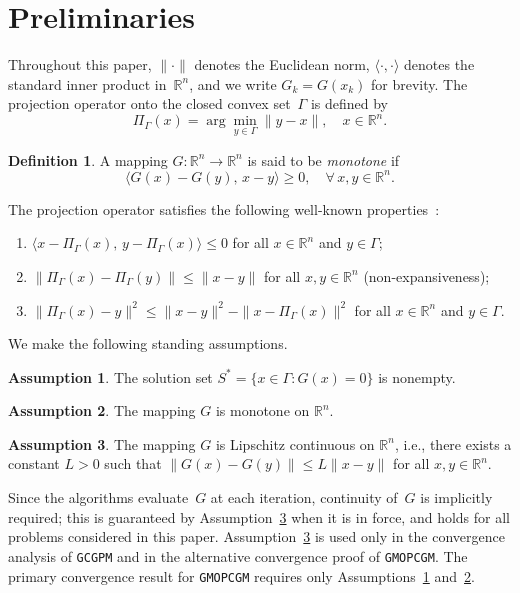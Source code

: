 \documentclass{article}
\theoremstyle{plain}
\theoremstyle{definition}
\newtheorem{definition}{Definition}
\newtheorem{assumption}{Assumption}
\theoremstyle{remark}
\newcommand{\R}{\mathbb{R}}
\newcommand{\norm}[1]{\|#1\|}
\newcommand{\PG}{\Pi_{\Gamma}}
\newcommand{\algoname}[1]{{\small\texttt{#1}}}
\newcommand{\GMOPCGM}{\algoname{GMOPCGM}}
\newcommand{\GCGPM}{\algoname{GCGPM}}
\begin{document}
\section{Preliminaries}\label{sec:prelim}

Throughout this paper, $\norm{\cdot}$ denotes the Euclidean norm, $\langle \cdot, \cdot \rangle$ denotes the standard inner product in~$\R^n$, and we write $G_k = G(x_k)$ for brevity. The projection operator onto the closed convex set~$\Gamma$ is defined by
\[
  \PG(x) = \arg\min_{y \in \Gamma} \norm{y - x}, \quad x \in \R^n.
\]

\begin{definition}\label{def:mono}
A mapping $G \colon \R^n \to \R^n$ is said to be \emph{monotone} if
\[
  \langle G(x) - G(y),\, x - y \rangle \geq 0, \quad \forall\, x, y \in \R^n.
\]
\end{definition}

The projection operator satisfies the following well-known properties~\cite{solodov1999globally}:
\begin{enumerate}[label=(\alph*), nosep]
  \item $\langle x - \PG(x),\, y - \PG(x) \rangle \leq 0$ for all $x \in \R^n$ and $y \in \Gamma$;
  \item $\norm{\PG(x) - \PG(y)} \leq \norm{x - y}$ for all $x, y \in \R^n$ (non-expansiveness);
  \item $\norm{\PG(x) - y}^2 \leq \norm{x - y}^2 - \norm{x - \PG(x)}^2$ for all $x \in \R^n$ and $y \in \Gamma$.
\end{enumerate}

We make the following standing assumptions.

\begin{assumption}\label{A1}
The solution set $S^* = \{x \in \Gamma : G(x) = 0\}$ is nonempty.
\end{assumption}

\begin{assumption}\label{A2}
The mapping $G$ is monotone on $\R^n$.
\end{assumption}

\begin{assumption}\label{A3}
The mapping $G$ is Lipschitz continuous on $\R^n$, i.e., there exists a constant $L > 0$ such that $\norm{G(x) - G(y)} \leq L\norm{x - y}$ for all $x, y \in \R^n$.
\end{assumption}

Since the algorithms evaluate~$G$ at each iteration, continuity of~$G$ is implicitly required; this is guaranteed by Assumption~\ref{A3} when it is in force, and holds for all problems considered in this paper. Assumption~\ref{A3} is used only in the convergence analysis of \GCGPM{} and in the alternative convergence proof of \GMOPCGM. The primary convergence result for \GMOPCGM{} requires only Assumptions~\ref{A1} and~\ref{A2}.
\end{document}
